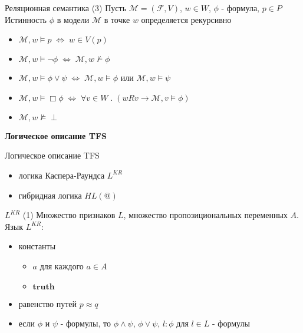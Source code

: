 \documentclass{beamer}
\begin{document}
\begin{frame}{Реляционная семантика (3)}
Пусть $\mathcal{M} = (\mathcal{F}, V)$, $w \in W$, $\phi$ - формула, $p \in P$\\
\bigskip
Истинность $\phi$ в модели $\mathcal{M}$ в точке $w$ определяется рекурсивно\\
\bigskip
\begin{itemize}
  \item $\mathcal{M}, w \models p \; \Longleftrightarrow \; w \in V(p)$
  \item $\mathcal{M}, w \models \neg \phi \; \Longleftrightarrow \; \mathcal{M}, w \not\models \phi$
  \item $\mathcal{M}, w \models \phi \vee \psi \; \Longleftrightarrow \; \mathcal{M}, w \models \phi$ или $\mathcal{M}, w \models \psi$
  \item $\mathcal{M}, w \models \Box \phi \; \Longleftrightarrow \; \forall v \in W \; . \; (w R v \to \mathcal{M}, v \models \phi)$
  \item $\mathcal{M}, w \not\models \perp$
\end{itemize}
\end{frame}



\begin{frame}{}
\begin{center}
	\textbf{Логическое описание TFS}
\end{center}
\end{frame}

\begin{frame}{Логическое описание TFS}
\begin{itemize}
	\item логика Каспера-Раундса $L^{KR}$
	\item гибридная логика $HL(@)$
\end{itemize}
\end{frame}

\begin{frame}{$L^{KR}$ (1)}
Множество признаков $L$, множество пропозициональных переменных $A$.\\
\bigskip
Язык $L^{KR}$:\\
\bigskip
\begin{itemize}
	\item константы
		\begin{itemize}
			\item $a$ для каждого $a \in A$
			\item $\textbf{truth}$
		\end{itemize}
	\item равенство путей $p \approx q$
	\item если $\phi$ и $\psi$ - формулы, то $\phi \wedge \psi$, $\phi \vee \psi$, $l : \phi$ для $l \in L$ - формулы
\end{itemize}
\end{frame}
\end{document}
